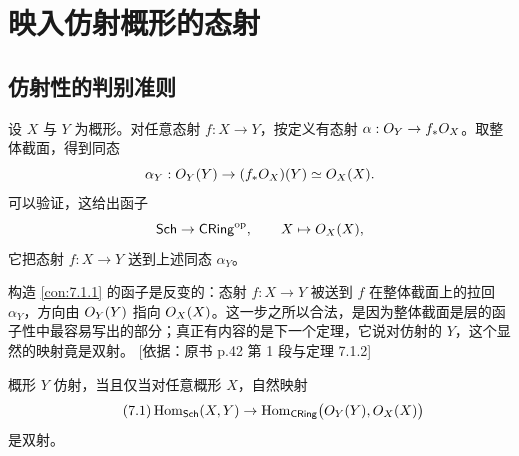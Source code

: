 
\section{映入仿射概形的态射}\label{sec:7}

\subsection{仿射性的判别准则}\label{sec:7.1}

\begin{construction}\label{con:7.1.1}
设 $X$ 与 $Y$ 为概形。对任意态射 $f:X\to Y$，按定义有态射 $\alpha:O_Y\to f_*O_X$。取整体截面，得到同态
\[
\alpha_Y:O_Y(Y)\to(f_*O_X)(Y)\simeq O_X(X).
\]
可以验证，这给出函子
\[
\mathsf{Sch}\to\mathsf{CRing}^{\mathrm{op}},\qquad X\mapsto O_X(X),
\]
它把态射 $f:X\to Y$ 送到上述同态 $\alpha_Y$。
\end{construction}

\begin{yizhu}
构造 \ref{con:7.1.1} 的函子是反变的：态射 $f:X\to Y$ 被送到 $f$ 在整体截面上的拉回 $\alpha_Y$，方向由 $O_Y(Y)$ 指向 $O_X(X)$。这一步之所以合法，是因为整体截面是层的函子性中最容易写出的部分；真正有内容的是下一个定理，它说对仿射的 $Y$，这个显然的映射竟是双射。
[依据：原书 p.42 第 1 段与定理 7.1.2]
\end{yizhu}

\begin{theorem}\label{thm:7.1.2}
概形 $Y$ 仿射，当且仅当对任意概形 $X$，自然映射
\begin{equation}\tag{7.1}\label{eq:7.1}
\operatorname{Hom}_{\mathsf{Sch}}(X,Y)\to\operatorname{Hom}_{\mathsf{CRing}}\bigl(O_Y(Y),O_X(X)\bigr)
\end{equation}
是双射。
\end{theorem}

